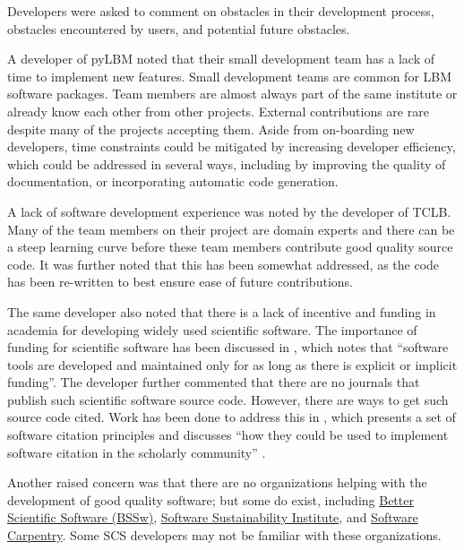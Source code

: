 \documentclass[12pt, notitlepage]{article}
\begin{document}
Developers were asked to comment on obstacles in their development process, obstacles encountered by users, and potential future obstacles. 

A developer of pyLBM noted that their small development team has a lack of time to implement new features. Small development teams are common for LBM software packages. Team members are almost always part of the same institute or already know each other from other projects. External contributions are rare despite many of the projects accepting them. Aside from on-boarding new developers, time constraints could be mitigated by increasing developer efficiency, which could be addressed in several ways, including by improving the quality of documentation, or incorporating automatic code generation.

A lack of software development experience was noted by the developer of TCLB. Many of the team members on their project are domain experts and there can be a steep learning curve before these team members contribute good quality source code. It was further noted that this has been somewhat addressed, as the code has been re-written to best ensure ease of future contributions. 

The same developer also noted that there is a lack of incentive and funding in academia for developing widely used scientific software. The importance of funding for scientific software has been discussed in \cite{gewaltig2012quality}, which notes that ``software tools are developed and maintained only for as long as there is explicit or implicit funding''. The developer further commented that there are no journals that publish such scientific software source code. However, there are ways to get such source code cited. Work has been done to address this in \citep{smith2016software}, which presents a set of software citation principles and discusses ``how they could be used to implement software citation in the scholarly community'' \citep{katz2019software}. 

Another raised concern was that there are no organizations helping with the development of good quality software; but some do exist, including \href{https://bssw.io/}{Better Scientific Software (BSSw)}, \href{https://www.software.ac.uk/}{Software Sustainability Institute}, and \href{https://software-carpentry.org/}{Software Carpentry}. Some SCS developers may not be familiar with these organizations. 
\end{document}
